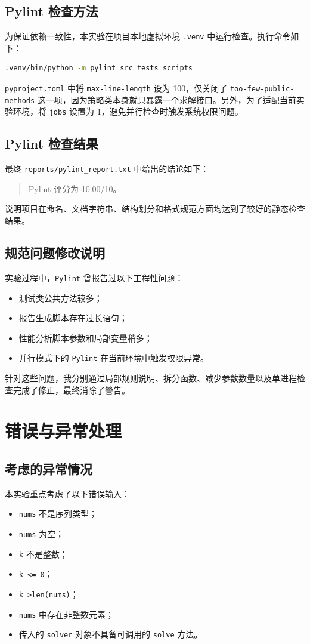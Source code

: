 \documentclass[UTF8,a4paper,12pt]{ctexart}
\begin{document}
\subsection{Pylint 检查方法}
为保证依赖一致性，本实验在项目本地虚拟环境 \texttt{.venv} 中运行检查。执行命令如下：

\begin{lstlisting}[language=bash]
.venv/bin/python -m pylint src tests scripts
\end{lstlisting}

\texttt{pyproject.toml} 中将 \texttt{max-line-length} 设为 100，仅关闭了
\texttt{too-few-public-methods} 这一项，因为策略类本身就只暴露一个求解接口。另外，为了适配当前实验环境，将 \texttt{jobs} 设置为 1，避免并行检查时触发系统权限问题。

\subsection{Pylint 检查结果}
最终 \texttt{reports/pylint\_report.txt} 中给出的结论如下：
\begin{quote}
Pylint 评分为 10.00/10。
\end{quote}
说明项目在命名、文档字符串、结构划分和格式规范方面均达到了较好的静态检查结果。

\subsection{规范问题修改说明}
实验过程中，\texttt{Pylint} 曾报告过以下工程性问题：
\begin{itemize}
    \item 测试类公共方法较多；
    \item 报告生成脚本存在过长语句；
    \item 性能分析脚本参数和局部变量稍多；
    \item 并行模式下的 \texttt{Pylint} 在当前环境中触发权限异常。
\end{itemize}
针对这些问题，我分别通过局部规则说明、拆分函数、减少参数数量以及单进程检查完成了修正，最终消除了警告。

\section{错误与异常处理}
\subsection{考虑的异常情况}
本实验重点考虑了以下错误输入：
\begin{itemize}
    \item \texttt{nums} 不是序列类型；
    \item \texttt{nums} 为空；
    \item \texttt{k} 不是整数；
    \item \texttt{k \textless= 0}；
    \item \texttt{k \textgreater len(nums)}；
    \item \texttt{nums} 中存在非整数元素；
    \item 传入的 \texttt{solver} 对象不具备可调用的 \texttt{solve} 方法。
\end{itemize}
\end{document}
